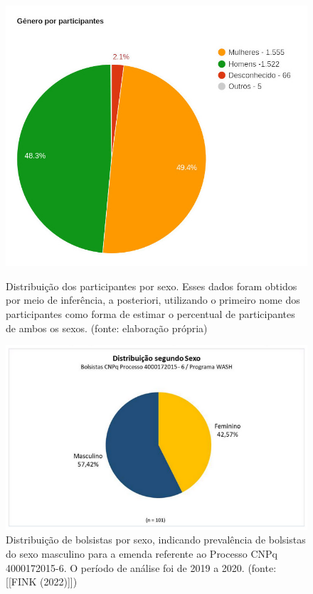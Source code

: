 \captionsetup{format=plain}
\begin{figure}[p]

\centering


\begin{minipage}[b]{0.4\linewidth}
        \centering
                \includegraphics[width=1.0\linewidth]{../../../imagens/genero-todos-crop.jpeg}
                \caption{Distribuição dos participantes por sexo. Esses dados foram obtidos por meio de inferência, a posteriori, utilizando o primeiro nome dos participantes como forma de estimar o percentual de participantes de ambos os sexos. (fonte: elaboração própria)}
                \label{ef11d820efb73d78fb64eb6bdd03853471a8e89f}
\end{minipage}%
\hspace{0.5cm}
\begin{minipage}[b]{0.4\linewidth}
        \centering
                \includegraphics[width=1.0\linewidth]{../../../imagens/distribuicao-sexo-bolsistas.png}
                \caption{Distribuição de bolsistas por sexo, indicando prevalência de bolsistas do sexo masculino para a emenda referente ao Processo CNPq 4000172015-6. O período de análise foi de 2019 a 2020. (fonte: [[FINK (2022)]])}
                \label{1164a3115bd14e3f25b6b141840652ffbd0d2374}
\end{minipage}
\hspace{0.5cm}
\end{figure}
